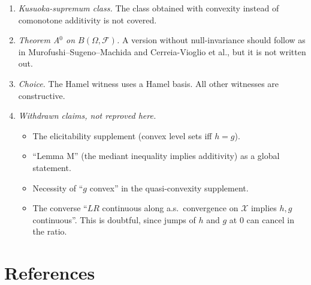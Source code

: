 \begin{enumerate}
\begin{itemize}
  \end{itemize}
\item \emph{Kusuoka-supremum class.} The class obtained with convexity instead of comonotone additivity is not covered.
\item \emph{Theorem A$^0$ on $B(\Omega,\mathcal F)$.} A version without null-invariance should follow as in Murofushi--Sugeno--Machida and Cerreia-Vioglio et al., but it is not written out.
\item \emph{Choice.} The Hamel witness uses a Hamel basis. All other witnesses are constructive.
\item \emph{Withdrawn claims, not reproved here.}
  \begin{itemize}
  \item The elicitability supplement (convex level sets iff $h=g$).
  \item ``Lemma M'' (the mediant inequality implies additivity) as a global statement.
  \item Necessity of ``$g$ convex'' in the quasi-convexity supplement.
  \item The converse ``$LR$ continuous along a.s.\ convergence on $\mathcal X$ implies $h,g$ continuous''. This is doubtful, since jumps of $h$ and $g$ at $0$ can cancel in the ratio.
  \end{itemize}
\end{enumerate}

\section*{References}

